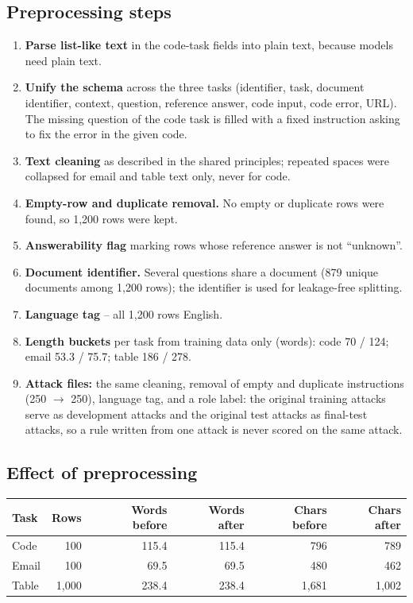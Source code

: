 \documentclass[11pt,a4paper]{article}
\newcommand{\hdr}[1]{\textbf{#1}}
\begin{document}
\subsection{Preprocessing steps}
\begin{enumerate}
\item \textbf{Parse list-like text} in the code-task fields into plain text, because models need plain text.
\item \textbf{Unify the schema} across the three tasks (identifier, task, document identifier, context, question, reference answer, code input, code error, URL). The missing question of the code task is filled with a fixed instruction asking to fix the error in the given code.
\item \textbf{Text cleaning} as described in the shared principles; repeated spaces were collapsed for email and table text only, never for code.
\item \textbf{Empty-row and duplicate removal.} No empty or duplicate rows were found, so 1{,}200 rows were kept.
\item \textbf{Answerability flag} marking rows whose reference answer is not ``unknown''.
\item \textbf{Document identifier.} Several questions share a document (879 unique documents among 1{,}200 rows); the identifier is used for leakage-free splitting.
\item \textbf{Language tag} -- all 1{,}200 rows English.
\item \textbf{Length buckets} per task from training data only (words): code 70 / 124; email 53.3 / 75.7; table 186 / 278.
\item \textbf{Attack files:} the same cleaning, removal of empty and duplicate instructions (250 $\to$ 250), language tag, and a role label: the original training attacks serve as development attacks and the original test attacks as final-test attacks, so a rule written from one attack is never scored on the same attack.
\end{enumerate}

\subsection{Effect of preprocessing}
\begin{tabularx}{\textwidth}{@{}l r r r r r@{}}
\toprule
\rowcolor{band}\hdr{Task} & \hdr{Rows} & \hdr{Words before} & \hdr{Words after} & \hdr{Chars before} & \hdr{Chars after}\\
\midrule
Code & 100 & 115.4 & 115.4 & 796 & 789\\
Email & 100 & 69.5 & 69.5 & 480 & 462\\
Table & 1{,}000 & 238.4 & 238.4 & 1{,}681 & 1{,}002\\
\bottomrule
\end{tabularx}
\end{document}
